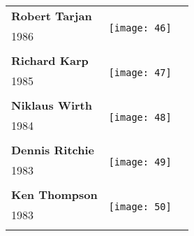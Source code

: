 \documentclass[12pt]{article}
\begin{document}
\begin{center}
\begin{longtable}{| p{} | p{} | p{20cm}}
\hline
\textbf{Robert Tarjan}  &  \multirow{3}{4em}{\texttt{[image: 46]}} \\ 
1986&   \\ 
&\\
\hline
\textbf{Richard Karp} &  \multirow{3}{4em}{\texttt{[image: 47]}} \\ 
1985&   \\ 
&\\
\hline
\textbf{Niklaus Wirth} &  \multirow{3}{4em}{\texttt{[image: 48]}} \\ 
1984&   \\ 
&\\
\hline
\textbf{Dennis Ritchie}  &  \multirow{3}{4em}{\texttt{[image: 49]}} \\ 
1983&   \\ 
&\\
\hline
\textbf{Ken Thompson} &  \multirow{3}{4em}{\texttt{[image: 50]}} \\ 
1983&   \\ 
&\\
\hline


\end{longtable}
\end{center}
\end{document}

